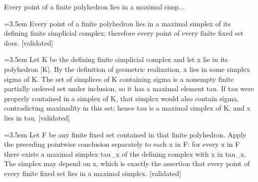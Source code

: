 \documentclass{article}
\newcommand{\step}[1]{\par\noindent\hangindent=3.5em\hangafter=1%
  \makebox[3.5em][l]{\textbf{#1.}}}
\newcommand{\steptag}[1]{\hfill{\small\textsf{[#1]}}}
\begin{document}
\begin{proofbox}{Every point of a finite polyhedron lies in a maximal simp...}
\step{1} Every point of a finite polyhedron lies in a maximal simplex of its defining finite simplicial complex; therefore every point of every finite fixed set does. \steptag{validated} \\[6pt]
\step{1.1} Let K be the defining finite simplicial complex and let x lie in its polyhedron |K|. By the definition of geometric realization, x lies in some simplex sigma of K. The set of simplices of K containing sigma is a nonempty finite partially ordered set under inclusion, so it has a maximal element tau. If tau were properly contained in a simplex of K, that simplex would also contain sigma, contradicting maximality in this set; hence tau is a maximal simplex of K, and x lies in tau. \steptag{validated} \\[4pt]
\step{1.2} Let F be any finite fixed set contained in that finite polyhedron. Apply the preceding pointwise conclusion separately to each x in F: for every x in F there exists a maximal simplex tau\_x of the defining complex with x in tau\_x. The simplex may depend on x, which is exactly the assertion that every point of every finite fixed set lies in a maximal simplex. \steptag{validated} \\[4pt]
\end{proofbox}
\end{document}
